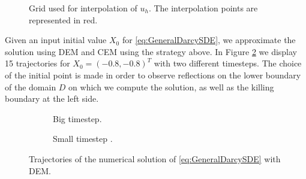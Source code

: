 \begin{figure}[t]
    \centering
    \resizebox{0.8\linewidth}{!}{ }  
    \caption{Grid used for interpolation of $u_h$. The interpolation points are represented in red.}
    \label{fig:GridVelocity}
\end{figure}
\noindent Given an input initial value $X_0$ for \eqref{eq:GeneralDarcySDE}, we approximate the solution using DEM and CEM using the strategy above. In Figure \ref{fig:TrajSDEDarcy} we display 15 trajectories for $X_0 = (-0.8,-0.8)^T$ with two different timesteps. The choice of the initial point is made in order to observe reflections on the lower boundary of the domain $D$ on which we compute the solution, as well as the killing boundary at the left side. 

\begin{figure}[t]
    \centering
    \begin{subfigure}{0.49\linewidth}
        \centering
        \resizebox{1\linewidth}{!}{ }  
        \caption{Big timestep.}
    \end{subfigure}
    \begin{subfigure}{0.49\linewidth}
        \centering
        \resizebox{1\linewidth}{!}{ }  
        \caption{Small timestep .}
    \end{subfigure}    
    \caption{Trajectories of the numerical solution of \eqref{eq:GeneralDarcySDE} with DEM.}
    \label{fig:TrajSDEDarcy}
\end{figure}

